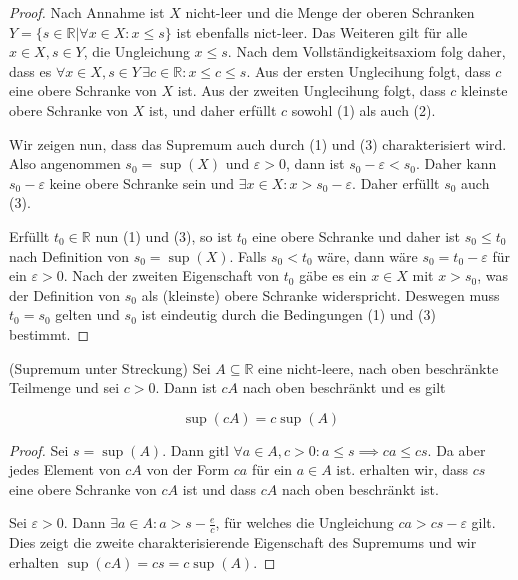 \documentclass[../Analysis1_script.tex]{subfiles}
\begin{document}
\begin{proof}
	Nach Annahme ist $X$ nicht-leer und die Menge der oberen Schranken $Y = \{s \in \mathbb{R} | \forall x \in X: x \leq s\}$ ist ebenfalls nict-leer. Das Weiteren gilt für alle $x \in X, s \in Y$, die Ungleichung $x \leq s$. Nach dem Vollständigkeitsaxiom folg daher, dass es $\forall x \in X, s \in Y \, \exists c \in \mathbb{R}: x \leq c \leq s$. Aus der ersten Unglecihung folgt, dass $c$ eine obere Schranke von $X$ ist. Aus der zweiten Unglecihung folgt, dass $c$ kleinste obere Schranke von $X$ ist, und daher erfüllt $c$ sowohl (1) als auch (2).
	
	Wir zeigen nun, dass das Supremum auch durch (1) und (3) charakterisiert wird. Also angenommen $s_0 = \sup(X)$ und $\varepsilon > 0$, dann ist $s_0 - \varepsilon < s_0$. Daher kann $s_0 - \varepsilon$ keine obere Schranke sein und $\exists x \in X: x > s_0 - \varepsilon$. Daher erfüllt $s_0$ auch (3).
	
	Erfüllt $t_0 \in \mathbb {R}$ nun (1) und (3), so ist $t_0$ eine obere Schranke und daher ist $s_0 \leq t_0$ nach Definition von $s_0 = \sup (X)$. Falls $s_0 < t_0$ wäre, dann wäre $s_0 = t_0 - \varepsilon$ für ein $\varepsilon > 0$. Nach der zweiten Eigenschaft von $t_0$ gäbe es ein $x \in X$ mit $x>s_0$, was der Definition von $s_0$ als (kleinste) obere Schranke widerspricht. Deswegen muss $t_0 = s_0$ gelten und $s_0$ ist eindeutig durch die Bedingungen (1) und (3) bestimmt.  
\end{proof}

\begin{proposition}{(Supremum unter Streckung)}
	Sei $A \subseteq \mathbb{R}$ eine nicht-leere, nach oben beschränkte Teilmenge und sei $c > 0$. Dann ist $cA$ nach oben beschränkt und es gilt
	
	\[\sup(cA) = c \sup(A)\]
\end{proposition}

\begin{proof}
	Sei $s = \sup(A)$. Dann gitl $\forall a \in A, c > 0 : a \leq s \implies ca \leq cs$. Da aber jedes Element von $cA$ von der Form $ca$ für ein $a \in A$ ist. erhalten wir, dass $cs$ eine obere Schranke von $cA$ ist und dass $cA$ nach oben beschränkt ist.
	
	Sei $\varepsilon > 0$. Dann $\exists a \in A: a > s - \frac{e}{c}$, für welches die Ungleichung $ca > cs -\varepsilon$ gilt. Dies zeigt die zweite charakterisierende Eigenschaft des Supremums und wir erhalten $\sup (cA) = cs=c \sup (A)$.
\end{proof}
\end{document}
